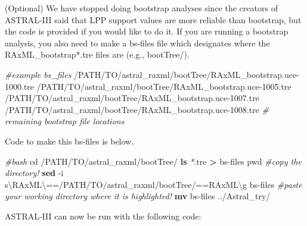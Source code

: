 \documentclass[
  12pt,
]{article}
\newenvironment{Shaded}{\begin{snugshade}}{\end{snugshade}}
\newcommand{\AttributeTok}[1]{\textcolor[rgb]{0.13,0.29,0.53}{#1}}
\newcommand{\BuiltInTok}[1]{#1}
\newcommand{\CommentTok}[1]{\textcolor[rgb]{0.56,0.35,0.01}{\textit{#1}}}
\newcommand{\ExtensionTok}[1]{#1}
\newcommand{\FunctionTok}[1]{\textcolor[rgb]{0.13,0.29,0.53}{\textbf{#1}}}
\newcommand{\NormalTok}[1]{#1}
\newcommand{\OperatorTok}[1]{\textcolor[rgb]{0.81,0.36,0.00}{\textbf{#1}}}
\newcommand{\PreprocessorTok}[1]{\textcolor[rgb]{0.56,0.35,0.01}{\textit{#1}}}
\newcommand{\StringTok}[1]{\textcolor[rgb]{0.31,0.60,0.02}{#1}}
\begin{document}
(Optional) We have stopped doing bootstrap analyses since the creators of ASTRAL-III said that LPP support values are more reliable than bootstrap, but the code is provided if you would like to do it. If you are running a bootstrap analysis, you also need to make a bs-files file which designates where the RAxML\_bootstrap*.tre files are (e.g., bootTree/).

\begin{Shaded}
\begin{Highlighting}[]
\CommentTok{\#example bs\_files}
\ExtensionTok{/PATH/TO/astral\_raxml/bootTree/RAxML\_bootstrap.uce{-}1000.tre}
\ExtensionTok{/PATH/TO/astral\_raxml/bootTree/RAxML\_bootstrap.uce{-}1005.tre}
\ExtensionTok{/PATH/TO/astral\_raxml/bootTree/RAxML\_bootstrap.uce{-}1007.tre}
\ExtensionTok{/PATH/TO/astral\_raxml/bootTree/RAxML\_bootstrap.uce{-}1008.tre}
\CommentTok{\# remaining bootstrap file locations}
\end{Highlighting}
\end{Shaded}

Code to make this bs-files is below.

\begin{Shaded}
\begin{Highlighting}[]
\CommentTok{\#bash}
\BuiltInTok{cd}\NormalTok{ /PATH/TO/astral\_raxml/bootTree/}
\FunctionTok{ls} \PreprocessorTok{*}\NormalTok{.tre }\OperatorTok{\textgreater{}}\NormalTok{ bs{-}files}
\BuiltInTok{pwd} \CommentTok{\#copy the directory!}
\FunctionTok{sed} \AttributeTok{{-}i} \StringTok{\textquotesingle{}s\textbackslash{}RAxML\textbackslash{}==/PATH/TO/astral\_raxml/bootTree/==RAxML\textbackslash{}g\textquotesingle{}}\NormalTok{ bs{-}files }\CommentTok{\#paste your working directory where it is highlighted!}
\FunctionTok{mv}\NormalTok{ bs{-}files ../Astral\_try/}
\end{Highlighting}
\end{Shaded}

ASTRAL-III can now be run with the following code:
\end{document}
